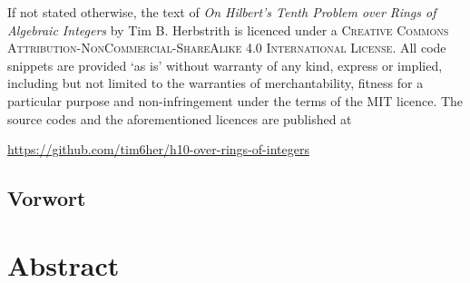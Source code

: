 \newpage%
\thispagestyle{empty}%
\vspace*{\fill}%
\noindent%
\begin{footnotesize}%
If not stated otherwise, the text of \emph{On Hilbert's Tenth Problem over Rings
of Algebraic Integers} by Tim B. Herbstrith is licenced under a \textsc{Creative
Commons Attribution-NonCommercial-ShareAlike 4.0 International License}. All
code snippets are provided `as is' without warranty of any kind, express or
implied, including but not limited to the warranties of merchantability, fitness
for a particular purpose and non-infringement under the terms of the
\textsc{MIT} licence. The source codes and the aforementioned licences are
published at
\begin{center}
 \url{https://github.com/tim6her/h10-over-rings-of-integers}
\end{center}
\end{footnotesize}
\cleardoublepage


\begin{german}
\section*{Vorwort}
\end{german}

\vspace{1.5cm}

\section*{Abstract}
\newpage
\thispagestyle{empty}
\tableofcontents
